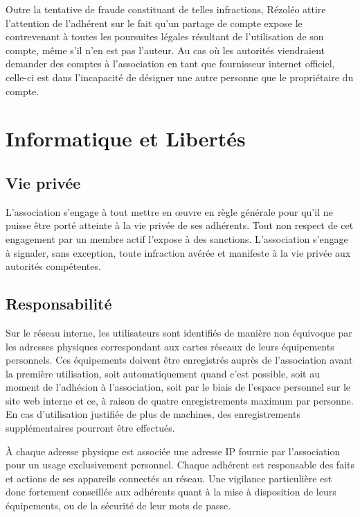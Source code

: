 \documentclass[12pt, a4paper]{article}
\begin{document}
	\bigskip

	Outre la tentative de fraude constituant de telles infractions, Rézoléo attire
	l'attention de l'adhérent sur le fait qu'un partage de compte expose le
	contrevenant à toutes les poursuites légales résultant de l'utilisation de son
	compte, même s'il n'en est pas l'auteur. Au cas où les autorités viendraient
	demander des comptes à l'association en tant que fournisseur internet officiel,
	celle-ci est dans l'incapacité de désigner une autre personne que le propriétaire
	du compte.

	\section{Informatique et Libertés}

	\subsection{Vie privée}

	L'association s'engage à tout mettre en œuvre en règle générale pour qu'il ne puisse
	être porté atteinte à la vie privée de ses adhérents. Tout non respect de cet
	engagement par un membre actif l'expose à des sanctions. L'association s'engage
	à signaler, sans exception, toute infraction avérée et manifeste à la vie privée
	aux autorités compétentes.

	\subsection{Responsabilité}

	Sur le réseau interne, les utilisateurs sont identifiés de manière non équivoque
	par les adresses physiques correspondant aux cartes réseaux de leurs équipements
	personnels. Ces équipements doivent être enregistrés auprès de l'association
	avant la première utilisation, soit automatiquement quand c'est possible, soit
	au moment de l'adhésion à l'association, soit par le biais de l'espace personnel
	sur le site web interne et ce, à raison de quatre enregistrements maximum par
	personne. En cas d'utilisation justifiée de plus de machines, des
	enregistrements supplémentaires pourront être effectués.

	\bigskip

	À chaque adresse physique est associée une adresse IP fournie par l'association
	pour un usage exclusivement personnel. Chaque adhérent est responsable des
	faits et actions de ses appareils connectés au réseau. Une vigilance particulière
	est donc fortement conseillée aux adhérents quant à la mise à disposition de leurs
	équipements, ou de la sécurité de leur mots de passe.
\end{document}
